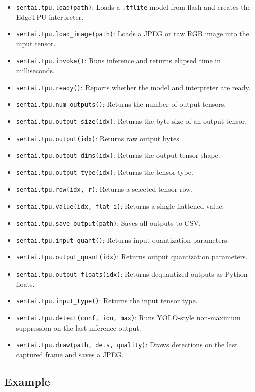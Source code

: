 \begin{itemize}
\tightlist
\item
  \texttt{sentai.tpu.load(path)}: Loads a \texttt{.tflite} model from
  flash and creates the EdgeTPU interpreter.
\item
  \texttt{sentai.tpu.load\_image(path)}: Loads a JPEG or raw RGB image
  into the input tensor.
\item
  \texttt{sentai.tpu.invoke()}: Runs inference and returns elapsed time
  in milliseconds.
\item
  \texttt{sentai.tpu.ready()}: Reports whether the model and interpreter
  are ready.
\item
  \texttt{sentai.tpu.num\_outputs()}: Returns the number of output
  tensors.
\item
  \texttt{sentai.tpu.output\_size(idx)}: Returns the byte size of an
  output tensor.
\item
  \texttt{sentai.tpu.output(idx)}: Returns raw output bytes.
\item
  \texttt{sentai.tpu.output\_dims(idx)}: Returns the output tensor
  shape.
\item
  \texttt{sentai.tpu.output\_type(idx)}: Returns the tensor type.
\item
  \texttt{sentai.tpu.row(idx,\ r)}: Returns a selected tensor row.
\item
  \texttt{sentai.tpu.value(idx,\ flat\_i)}: Returns a single flattened
  value.
\item
  \texttt{sentai.tpu.save\_output(path)}: Saves all outputs to CSV.
\item
  \texttt{sentai.tpu.input\_quant()}: Returns input quantization
  parameters.
\item
  \texttt{sentai.tpu.output\_quant(idx)}: Returns output quantization
  parameters.
\item
  \texttt{sentai.tpu.output\_floats(idx)}: Returns dequantized outputs
  as Python floats.
\item
  \texttt{sentai.tpu.input\_type()}: Returns the input tensor type.
\item
  \texttt{sentai.tpu.detect(conf,\ iou,\ max)}: Runs YOLO-style
  non-maximum suppression on the last inference output.
\item
  \texttt{sentai.tpu.draw(path,\ dets,\ quality)}: Draws detections on
  the last captured frame and saves a JPEG.
\end{itemize}

\subsection{Example}\label{example-2}

